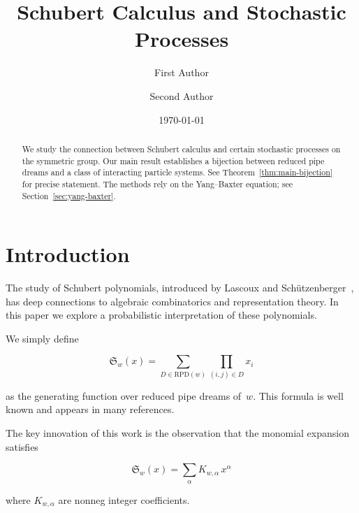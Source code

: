 \documentclass{amsart}
\theoremstyle{plain}
\theoremstyle{definition}
\theoremstyle{remark}
\begin{document}
\title{Schubert Calculus and Stochastic Processes}
\author{First Author \and Second Author}
\date{\today}
\maketitle

\begin{abstract}
We study the connection between Schubert calculus and certain   
stochastic processes on the symmetric group. Our main result establishes
a bijection between reduced pipe dreams and a class of interacting
particle systems. See Theorem~\ref{thm:main-bijection} for precise
statement. The methods rely on the Yang--Baxter equation; see
Section~\ref{sec:yang-baxter}.
\end{abstract}

\section{Introduction}
\label{sec:intro}

The study of Schubert polynomials, introduced by Lascoux and
Sch\"utzenberger~\cite{LS1982}, has deep connections to algebraic   
combinatorics and representation theory.  In this paper we explore
a probabilistic interpretation of these polynomials.



We simply define

$$
\mathfrak{S}_w(x) = \sum_{D \in \mathrm{RPD}(w)} \prod_{(i,j) \in D} x_i
$$

as the generating function over reduced pipe dreams of~$w$.
This formula is well known and appears in many references.

The key innovation of this work is the observation that   
the monomial expansion satisfies

\begin{equation}
\label{eq:main-expansion}
\mathfrak{S}_w(x) = \sum_{\alpha} K_{w,\alpha}\, x^\alpha
\end{equation}

where $K_{w,\alpha}$ are nonneg integer coefficients.
\end{document}
